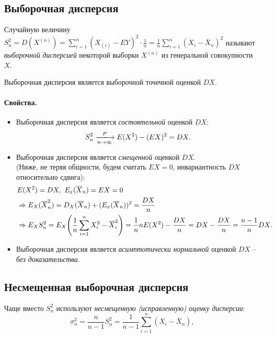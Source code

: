 \subsection{Выборочная дисперсия}

\begin{definition}
  Случайную величину $S^2_n = D(X^{(n)}) =
  \sum\limits_{i = 1}^{n} (X_{(i)} - EY)^2 \cdot \frac{1}{n} =
  \frac{1}{n} \sum\limits_{i = 1}^{n}(X_i - \overline{X}_n)^2$ называют
  \textit{выборочной дисперсией} некоторой выборки $X^{(n)}$ из генеральной
  совокупности $X$.
\end{definition}

Выборочная дисперсия является выборочной точечной оценкой $DX$.

\paragraph{Свойства.}
\begin{itemize}
  \item Выборочная дисперсия является \textit{состоятельной} оценкой $DX$:
  \[
    S^2_n \xlongrightarrow[n \to \infty]{P} E(X^2) - (EX)^2 = DX
  .\]

  \item Выборочная дисперсия является \textit{смещенной} оценкой $DX$.\\
  (Ниже, не теряя общности, будем считать $EX = 0$, инвариантность $DX$
  относительно сдвига):
  \begin{align*}
    &E(X^2) = DX,~ E_x(\overline{X}_n) = EX = 0\\
    &\Rightarrow E_X(\overline{X}^2_n) =
    D_X(\overline{X}_n) + (E_x(\overline{X}_n))^2 = \frac{DX}{n}\\
    &\Rightarrow E_X S^2_n =
    E_X\parens*{\frac{1}{n} \sum\limits_{i = 1}^{n} X^2_i - \overline{X}^2_i} =
    \frac{1}{n} n E(X^2) - \frac{DX}{n} = DX - \frac{DX}{n} =
    \frac{n - 1}{n} DX
  .\end{align*}

  \item Выборочная дисперсия является \textit{асимптотически нормальной}
  оценкой $DX$ -- \textit{без доказательства}.
\end{itemize}

\subsection{Несмещенная выборочная дисперсия}
\begin{definition}
  Чаще вместо $S^2_n$ используют \textit{несмещенную (исправленную) оценку
  дисперсии}:
  \[
    \sigma^2_n = \frac{n}{n - 1} S^2_n =
    \frac{1}{n - 1} \sum\limits_{i = 1}^{n} (X_i - \overline{X}_n)
  ,\]
\end{definition}

